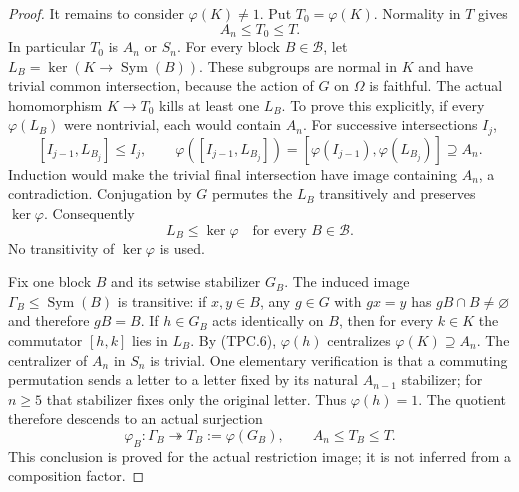 \begin{proof}
It remains to consider $\varphi(K)\ne1$.  Put $T_0=\varphi(K)$.
Normality in $T$ gives
\[
                         A_n\le T_0\le T.
 \tag{TPC.4}
\]
In particular $T_0$ is $A_n$ or $S_n$.  For every block
$B\in\mathcal B$, let $L_B=\ker(K\to\operatorname{Sym}(B))$.
These subgroups are normal in $K$ and have trivial common
intersection, because the action of $G$ on $\Omega$ is faithful.
The actual homomorphism $K\to T_0$ kills at least one $L_B$.
To prove this explicitly, if every $\varphi(L_B)$ were nontrivial,
each would contain $A_n$.  For successive intersections $I_j$,
\[
 [I_{j-1},L_{B_j}]\le I_j,
 \qquad
 \varphi([I_{j-1},L_{B_j}])
   =[\varphi(I_{j-1}),\varphi(L_{B_j})]\supseteq A_n.
 \tag{TPC.5}
\]
Induction would make the trivial final intersection have image
containing $A_n$, a contradiction.  Conjugation by $G$ permutes
the $L_B$ transitively and preserves $\ker\varphi$.  Consequently
\[
                   L_B\le\ker\varphi
                         \quad\text{for every }B\in\mathcal B.
 \tag{TPC.6}
\]
No transitivity of $\ker\varphi$ is used.

Fix one block $B$ and its setwise stabilizer $G_B$.
The induced image $\Gamma_B\le\operatorname{Sym}(B)$ is
transitive: if $x,y\in B$, any $g\in G$ with $gx=y$ has
$gB\cap B\ne\varnothing$ and therefore $gB=B$.
If $h\in G_B$ acts identically on $B$, then for every $k\in K$
the commutator $[h,k]$ lies in $L_B$.  By (TPC.6),
$\varphi(h)$ centralizes $\varphi(K)\supseteq A_n$.
The centralizer of $A_n$ in $S_n$ is trivial.  One elementary
verification is that a commuting permutation sends a letter to
a letter fixed by its natural $A_{n-1}$ stabilizer; for $n\ge5$
that stabilizer fixes only the original letter.  Thus
$\varphi(h)=1$.  The quotient therefore descends to an actual
surjection
\[
 \varphi_B:\Gamma_B\twoheadrightarrow T_B:=\varphi(G_B),
                  \qquad A_n\le T_B\le T.
 \tag{TPC.7}
\]
This conclusion is proved for the actual restriction image;
it is not inferred from a composition factor.


\end{proof}
